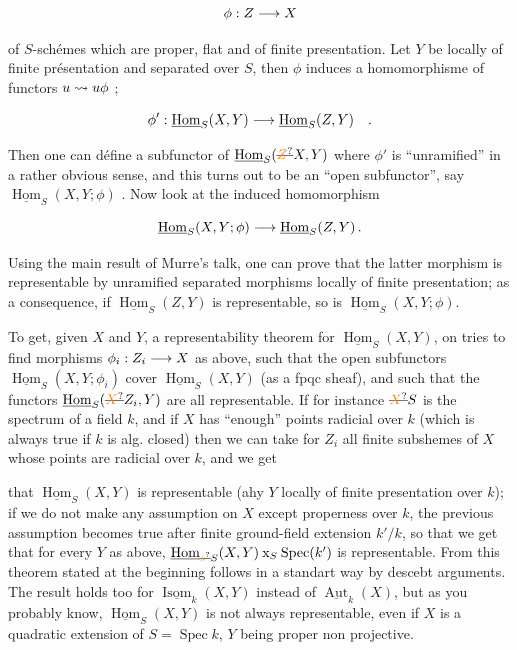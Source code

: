 \[
\phi: Z\longrightarrow X
\]

of $S$-schémes which are proper, flat and of finite presentation. Let $Y$ be locally of finite présentation and separated over $S$, then $\phi$ induces a homomorphisme of functors $u\leadsto u\phi$ ;

\[
\phi':\underline{\operatorname{Hom}}_S(X,Y)\longrightarrow\underline{\operatorname{Hom}}_S(Z,Y)\quad .
\]

Then one can défine a subfunctor of $\underline{\operatorname{Hom}}_S(\deleted{\unsure{Z}}X,Y)$ where $\phi'$ is ``unramified'' in a rather obvious sense, and this turns out to be an ``open subfunctor'', say $\underline{\operatorname{Hom}}_S(X,Y;\phi)$ . Now look at the induced homomorphism

\[
\underline{\operatorname{Hom}}_S(X,Y;\phi)\longrightarrow\underline{\operatorname{Hom}}_S(Z,Y)\,.
\]

Using the main result of Murre's talk, one can prove that the latter morphism is representable by unramified separated morphisms locally of finite presentation; as a consequence, if $\underline{\operatorname{Hom}}_S(Z,Y)$ is representable, so is $\underline{\operatorname{Hom}}_S(X,Y;\phi)$.

To get, given $X$ and $Y$, a representability theorem for $\underline{\operatorname{Hom}}_S(X,Y)$, on tries to find morphisms $\phi_i:Z_i\longrightarrow X$ as above, such that the open subfunctors $\underline{\operatorname{Hom}}_S(X,Y;\phi_i)$ cover $\underline{\operatorname{Hom}}_S(X,Y)$ (as a fpqc sheaf), and such that the functors $\underline{\operatorname{Hom}}_S(\deleted{\unsure{X}}Z_i,Y)$ are all representable. If for instance $\deleted{\unsure{X}}S$ is the spectrum of a field $k$, and if $X$ has ``enough'' points radicial over $k$ (which is always true if $k$ is alg. closed) then we can take for $Z_i$ all finite subshemes of $X$ whose points are radicial over $k$, and we get

that $\underline{\operatorname{Hom}}_S(X,Y)$ is representable (ahy $Y$ locally of finite presentation  over $k$); if we do not make any assumption on $X$ except properness over $k$, the previous assumption becomes true after finite ground-field extension $k'/k$, so that we get that for every $Y$ as above, $\underline{\operatorname{Hom}}_{\deleted{\unsure{s}}S}(X,Y)\mathbin{\mathrm{x}}_S\operatorname{Spec}(k')$ is representable. From this  theorem stated at the beginning follows in a standart way by descebt arguments. The result holds too for $\underline{\operatorname{Isom}}_k(X,Y)$ instead of $\underline{\operatorname{Aut}}_k(X)$, but as you probably know, $\underline{\operatorname{Hom}}_S(X,Y)$ is not always representable, even if $X$ is a quadratic extension of $S=\operatorname{Spec}k$, $Y$ being proper non projective.

